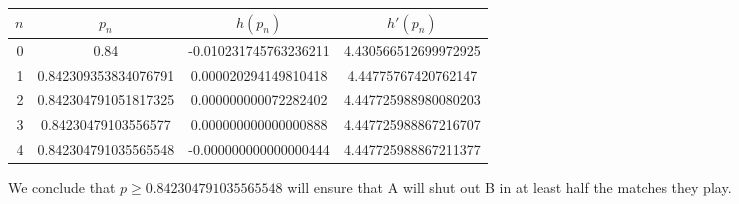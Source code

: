 \documentclass[../../../../Assignments]{subfiles}
\begin{document}
\begin{solution}
    \begin{table}[H]
        \centering
        \begin{tabular}{r S[table-format=1.18] S[table-format=-1.18] S[table-format=1.18]}
            \toprule
            \(n\)  &        {\(p_n\)}       &       {\(h(p_n)\)}      &      {\(h'(p_n)\)}     \\
              &  0.84                  &  -0.010231745763236211  &  4.430566512699972925  \\
                1  &  0.842309353834076791  &   0.000020294149810418  &  4.44775767420762147   \\
                2  &  0.842304791051817325  &   0.000000000072282402  &  4.447725988980080203  \\
                3  &  0.84230479103556577   &   0.000000000000000888  &  4.447725988867216707  \\
                4  &  0.842304791035565548  &  -0.000000000000000444  &  4.447725988867211377  \\
            \bottomrule
        \end{tabular}
    \end{table}

    We conclude that \(p \geq \num{0.842304791035565548}\) will ensure that A
    will shut out B in at least half the matches they play.
\end{solution}
\end{document}
